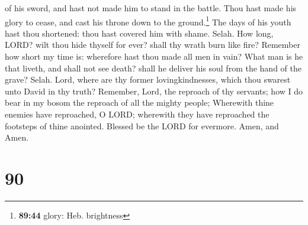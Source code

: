 of his sword, and hast not made him to stand in the battle.
 Thou hast made his glory to cease, and cast his throne
down to the ground.\footnote{\textbf{89:44} glory: Heb. brightness}
 The days of his youth hast thou shortened: thou hast
covered him with shame. Selah.  How long, LORD? wilt thou
hide thyself for ever? shall thy wrath burn like fire? 
Remember how short my time is: wherefore hast thou made all men in vain?
 What man is he that liveth, and shall not see death?
shall he deliver his soul from the hand of the grave? Selah.
 Lord, where are thy former lovingkindnesses, which thou
swarest unto David in thy truth?  Remember, Lord, the
reproach of thy servants; how I do bear in my bosom the reproach of all
the mighty people;  Wherewith thine enemies have
reproached, O LORD; wherewith they have reproached the footsteps of
thine anointed.  Blessed be the LORD for evermore. Amen,
and Amen.

\hypertarget{section-89}{%
\section{90}\label{section-89}}

